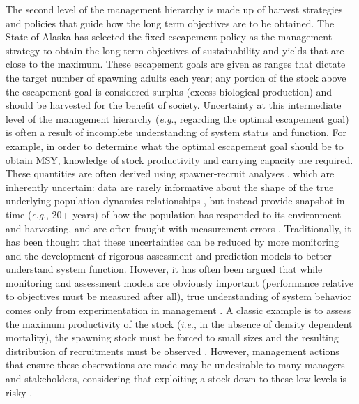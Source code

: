 \documentclass[12pt,]{book}
\theoremstyle{definition}
\theoremstyle{definition}
\theoremstyle{definition}
\theoremstyle{remark}
\begin{document}
The second level of the management hierarchy is made up of harvest
strategies and policies that guide how the long term objectives are to
be obtained. The State of Alaska has selected the fixed escapement
policy as the management strategy to obtain the long-term objectives of
sustainability and yields that are close to the maximum. These
escapement goals are given as ranges that dictate the target number of
spawning adults each year; any portion of the stock above the escapement
goal is considered surplus (excess biological production) and should be
harvested for the benefit of society. Uncertainty at this intermediate
level of the management hierarchy (\emph{e}.\emph{g}., regarding the
optimal escapement goal) is often a result of incomplete understanding
of system status and function. For example, in order to determine what
the optimal escapement goal should be to obtain MSY, knowledge of stock
productivity and carrying capacity are required. These quantities are
often derived using spawner-recruit analyses \citep[see][Ch.7 for an
overview]{walters-martell-2004}, which are inherently uncertain: data
are rarely informative about the shape of the true underlying population
dynamics relationships \citep{walters-hilborn-1976}, but instead provide
snapshot in time (\emph{e}.\emph{g}., 20+ years) of how the population
has responded to its environment and harvesting, and are often fraught
with measurement errors \citep{ludwig-walters-1981}. Traditionally, it
has been thought that these uncertainties can be reduced by more
monitoring and the development of rigorous assessment and prediction
models to better understand system function. However, it has often been
argued that while monitoring and assessment models are obviously
important (performance relative to objectives must be measured after
all), true understanding of system behavior comes only from
experimentation in management \citep[the concept of ``active adaptive
management'';][]{walters-1986}. A classic example is to assess the
maximum productivity of the stock (\emph{i}.\emph{e}., in the absence of
density dependent mortality), the spawning stock must be forced to small
sizes and the resulting distribution of recruitments must be observed
\citep{walters-hilborn-1976}. However, management actions that ensure
these observations are made may be undesirable to many managers and
stakeholders, considering that exploiting a stock down to these low
levels is risky \citep{walters-1986}.
\end{document}
